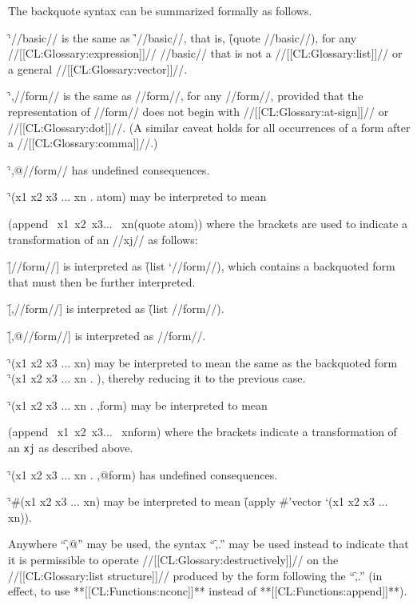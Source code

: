 The backquote syntax can be summarized formally as follows.

\beginlist \itemitem{\bull} \f{`//basic//} is the same as \f{'//basic//}, that is, \f{(quote //basic//)}, for any //[[CL:Glossary:expression]]//  //basic// that is not a //[[CL:Glossary:list]]// or a general //[[CL:Glossary:vector]]//.

\itemitem{\bull} \f{`,//form//} is the same as //form//, for any //form//, provided that the representation of //form// does not begin with //[[CL:Glossary:at-sign]]// or //[[CL:Glossary:dot]]//.  (A similar caveat holds for all occurrences of a form after a //[[CL:Glossary:comma]]//.)

\itemitem{\bull} \f{`,@//form//} has undefined consequences.

\itemitem{\bull} \f{`(x1 x2 x3 ... xn . atom)} may be interpreted to mean

\code
 (append \lbracket\ x1\rbracket \lbracket\ x2\rbracket \lbracket\ x3\rbracket ... \lbracket\ xn\rbracket (quote atom)) \endcode where the brackets are used to indicate a transformation of an //xj// as follows:

\beginlist \itemitem{--} \f{[//form//]} is interpreted as \f{(list `//form//)},  which contains a backquoted form that must then be further interpreted.

\itemitem{--} \f{[,//form//]} is interpreted as \f{(list //form//)}.

\itemitem{--} \f{[,@//form//]} is interpreted as //form//. \endlist

\itemitem{\bull} \f{`(x1 x2 x3 ... xn)} may be interpreted to mean the same as the backquoted form \f{`(x1 x2 x3 ... xn . \nil)}, thereby reducing it to the previous case.

\itemitem{\bull} \f{`(x1 x2 x3 ... xn . ,form)} may be interpreted to mean

\code
 (append \lbracket\ x1\rbracket \lbracket\ x2\rbracket \lbracket\ x3\rbracket ... \lbracket\ xn\rbracket form) \endcode where the brackets indicate a transformation of an {\tt xj} as described above.

\itemitem{\bull} \f{`(x1 x2 x3 ... xn . ,@form)} has undefined consequences.

\itemitem{\bull} \f{`\#(x1 x2 x3 ... xn)} may be interpreted to mean \f{(apply \#'vector `(x1 x2 x3 ... xn))}. \endlist

Anywhere ``\f{,@}'' may be used, the syntax ``\f{,.}'' may be used instead to indicate that it is permissible to operate //[[CL:Glossary:destructively]]// on  the //[[CL:Glossary:list structure]]//  produced by the form following the ``\f{,.}''  (in effect, to use **[[CL:Functions:nconc]]** instead of **[[CL:Functions:append]]**).

